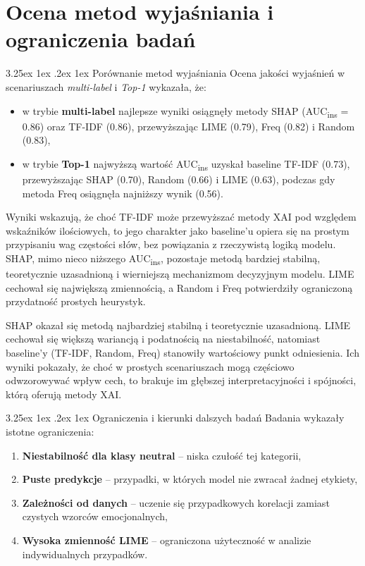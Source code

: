 \documentclass[wmii, inf, mgr]{uwmthesis}
\makeatletter
\renewcommand\paragraph{\@startsection{paragraph}{4}{\z@}%
  {3.25ex \@plus1ex \@minus.2ex}%
  {1ex}%
  {\normalfont\normalsize\bfseries}}
\makeatother
\begin{document}
\section{Ocena metod wyjaśniania i ograniczenia badań}
\paragraph{Porównanie metod wyjaśniania}
Ocena jakości wyjaśnień w scenariuszach \textit{multi-label} i \textit{Top-1} wykazała, że:
\begin{itemize}
	\item w trybie \textbf{multi-label} najlepsze wyniki osiągnęły metody SHAP (AUC\textsubscript{ins} = 0.86) oraz TF-IDF (0.86), przewyższając LIME (0.79), Freq (0.82) i Random (0.83),
	\item w trybie \textbf{Top-1} najwyższą wartość AUC\textsubscript{ins} uzyskał baseline TF-IDF (0.73), przewyższając SHAP (0.70), Random (0.66) i LIME (0.63), podczas gdy metoda Freq osiągnęła najniższy wynik (0.56).
\end{itemize}

Wyniki wskazują, że choć TF-IDF może przewyższać metody XAI pod względem wskaźników ilościowych, to jego charakter jako baseline’u opiera się na prostym przypisaniu wag częstości słów, bez powiązania z rzeczywistą logiką modelu. SHAP, mimo nieco niższego AUC\textsubscript{ins}, pozostaje metodą bardziej stabilną, teoretycznie uzasadnioną i wierniejszą mechanizmom decyzyjnym modelu. LIME cechował się największą zmiennością, a Random i Freq potwierdziły ograniczoną przydatność prostych heurystyk.


SHAP okazał się metodą najbardziej stabilną i teoretycznie uzasadnioną. LIME cechował się większą wariancją i podatnością na niestabilność, natomiast baseline’y (TF-IDF, Random, Freq) stanowiły wartościowy punkt odniesienia. Ich wyniki pokazały, że choć w prostych scenariuszach mogą częściowo odwzorowywać wpływ cech, to brakuje im głębszej interpretacyjności i spójności, którą oferują metody XAI.

\paragraph{Ograniczenia i kierunki dalszych badań}
Badania wykazały istotne ograniczenia:
\begin{enumerate}
	\item \textbf{Niestabilność dla klasy neutral} -- niska czułość tej kategorii,
	\item \textbf{Puste predykcje} -- przypadki, w których model nie zwracał żadnej etykiety,
	\item \textbf{Zależności od danych} -- uczenie się przypadkowych korelacji zamiast czystych wzorców emocjonalnych,
	\item \textbf{Wysoka zmienność LIME} -- ograniczona użyteczność w analizie indywidualnych przypadków.
\end{enumerate}
\end{document}
